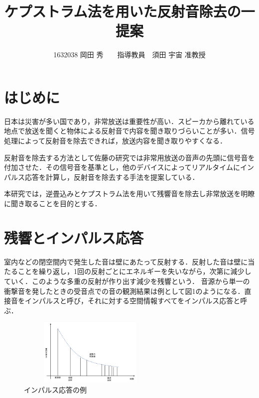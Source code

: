 \documentclass[twocolumn,10pt,a4j]{jsarticle}
\title{ケプストラム法を用いた反射音除去の一提案}
\author{1632038 岡田 秀　　指導教員　須田 宇宙 准教授}
\date{}
\begin{document}
\maketitle

\section{はじめに}

日本は災害が多い国であり，非常放送は重要性が高い\cite{oka1}．スピーカから離れている地点で放送を聞くと物体による反射音で内容を聞き取りづらいことが多い．信号処理によって反射音を除去できれば，放送内容を聞き取りやすくなる．

反射音を除去する方法として佐藤\cite{oka1}の研究では非常用放送の音声の先頭に信号音を付加させた．その信号音を基準とし，他のデバイスによってリアルタイムにインパルス応答を計算し，反射音を除去する手法を提案している．


本研究では，逆畳込みとケプストラム法を用いて残響音を除去し非常放送を明瞭に聞き取ることを目的とする．

\section{残響とインパルス応答}

室内などの閉空間内で発生した音は壁にあたって反射する．反射した音は壁に当たることを繰り返し，1回の反射ごとにエネルギーを失いながら，次第に減少していく．このような多重の反射が作り出す減少を残響という．
音源から単一の衝撃音を発したときの受音点での音の観測結果は例として図1のようになる．直接音をインパルスと呼び，それに対する空間情報すべてをインパルス応答と呼ぶ\cite{oka2}．


\begin{figure}[h]
\begin{center}
 \includegraphics[clip,width=70mm,height=32mm]{ReverberationImpulseResponse.pdf}
\end{center}
 \caption{インパルス応答の例\cite{oka2}}
 \label{fig:教科書}
\end{figure}
\end{document}
